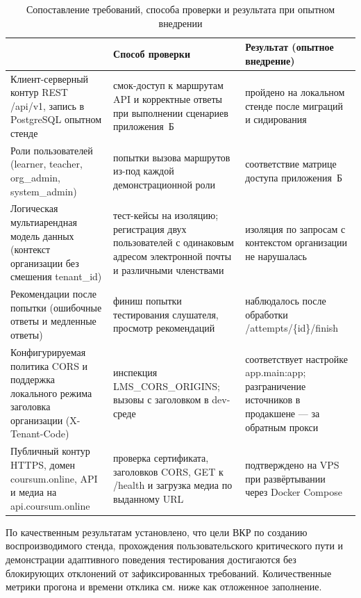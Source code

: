 \begin{table}[H]
\centering
\caption{Сопоставление требований, способа проверки и результата при опытном внедрении}
\label{tab:ch3-requirements-verify}
{\fontsize{12pt}{14pt}\selectfont
\setlength{\tabcolsep}{5pt}
\renewcommand{\arraystretch}{1.15}
\begin{tabularx}{\textwidth}{|>{\RaggedRight\arraybackslash}p{38mm}|>{\RaggedRight\arraybackslash}p{52mm}|>{\RaggedRight\arraybackslash}X|}
\hline
{\centering\arraybackslash\textbf{Требование}} & {\centering\arraybackslash\textbf{Способ проверки}} & {\centering\arraybackslash\textbf{Результат (опытное внедрение)}} \\
\hline
Клиент-серверный контур REST /api/v1, запись в PostgreSQL опытном стенде & смок-доступ к маршрутам API и корректные ответы при выполнении сценариев приложения~Б & пройдено на локальном стенде после миграций и сидирования \\
\hline
Роли пользователей (learner, teacher, org\_admin, system\_admin) & попытки вызова маршрутов из-под каждой демонстрационной роли & соответствие матрице доступа приложения~Б \\
\hline
Логическая мультиарендная модель данных (контекст организации без смешения tenant\_id) & тест-кейсы на изоляцию; регистрация двух пользователей с одинаковым адресом электронной почты и различными членствами & изоляция по запросам с контекстом организации не нарушалась \\
\hline
Рекомендации после попытки (ошибочные ответы и медленные ответы) & финиш попытки тестирования слушателя, просмотр рекомендаций & наблюдалось после обработки /attempts/\{id\}/finish \\
\hline
Конфигурируемая политика CORS и поддержка локального режима заголовка организации (X-Tenant-Code) & инспекция LMS\_CORS\_ORIGINS; вызовы с заголовком в dev-среде & соответствует настройке app.main:app; разграничение источников в продакшене --- за обратным прокси\\
\hline
Публичный контур HTTPS, домен coursum.online, API и медиа на api.coursum.online & проверка сертификата, заголовков CORS, GET к /health и загрузка медиа по выданному URL & подтверждено на VPS при развёртывании через Docker Compose\\
\hline
\end{tabularx}
}
\end{table}

По качественным результатам установлено, что цели ВКР по созданию воспроизводимого стенда, прохождения пользовательского критического пути и демонстрации адаптивного поведения тестирования достигаются без блокирующих отклонений от зафиксированных требований. Количественные метрики прогона и времени отклика см. ниже как отложенное заполнение.

